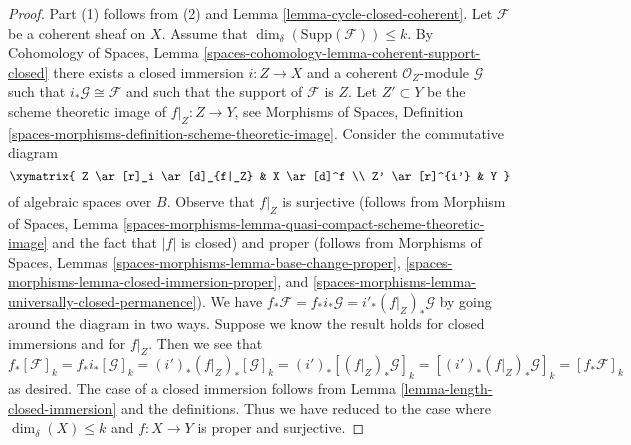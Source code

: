 \begin{proof}
Part (1) follows from (2) and Lemma \ref{lemma-cycle-closed-coherent}.
Let $\mathcal{F}$ be a coherent sheaf on $X$.
Assume that $\dim_\delta(\text{Supp}(\mathcal{F})) \leq k$.
By Cohomology of Spaces, Lemma
\ref{spaces-cohomology-lemma-coherent-support-closed}
there exists a closed immersion $i : Z \to X$ and a coherent
$\mathcal{O}_Z$-module $\mathcal{G}$ such that
$i_*\mathcal{G} \cong \mathcal{F}$ and such that the support
of $\mathcal{F}$ is $Z$. Let $Z' \subset Y$ be the scheme theoretic image
of $f|_Z : Z \to Y$, see Morphisms of Spaces, Definition
\ref{spaces-morphisms-definition-scheme-theoretic-image}.
Consider the commutative diagram
$$
\xymatrix{
Z \ar[r]_i \ar[d]_{f|_Z} &
X \ar[d]^f \\
Z' \ar[r]^{i'} & Y
}
$$
of algebraic spaces over $B$. Observe that $f|_Z$ is surjective
(follows from Morphism of Spaces, Lemma
\ref{spaces-morphisms-lemma-quasi-compact-scheme-theoretic-image}
and the fact that $|f|$ is closed) and proper
(follows from Morphisms of Spaces, Lemmas
\ref{spaces-morphisms-lemma-base-change-proper},
\ref{spaces-morphisms-lemma-closed-immersion-proper}, and
\ref{spaces-morphisms-lemma-universally-closed-permanence}).
We have $f_*\mathcal{F} = f_*i_*\mathcal{G} = i'_*(f|_Z)_*\mathcal{G}$
by going around the diagram in two ways. Suppose we know the result holds
for closed immersions and for $f|_Z$. Then we see that
$$
f_*[\mathcal{F}]_k = f_*i_*[\mathcal{G}]_k
= (i')_*(f|_Z)_*[\mathcal{G}]_k =
(i')_*[(f|_Z)_*\mathcal{G}]_k =
[(i')_*(f|_Z)_*\mathcal{G}]_k = [f_*\mathcal{F}]_k
$$
as desired. The case of a closed immersion follows from
Lemma \ref{lemma-length-closed-immersion} and the definitions.
Thus we have reduced to the case where
$\dim_\delta(X) \leq k$ and $f : X \to Y$ is proper and surjective.


\end{proof}
